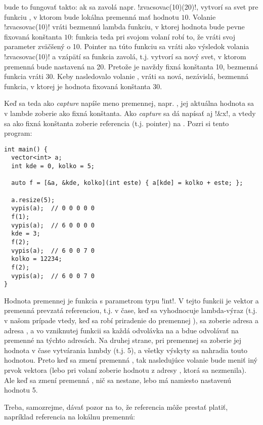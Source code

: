 {bude to fungovať takto: ak sa zavolá napr. \prg!zvacsovac(10)(20)!, vytvorí sa svet
pre funkciu , v ktorom bude lokálna premenná  mať hodnotu $10$.
Volanie \prg!zvacsovac(10)! vráti bezmennú lambda funkciu, v ktorej hodnota  bude pevne fixovaná
konštanta $10$: funkcia teda pri svojom volaní robí to, že vráti svoj parameter zväčšený o 10.
Pointer na túto funkciu sa vráti ako výsledok volania \prg!zvacsovac(10)! a vzápätí sa funkcia zavolá,
t.j. vytvorí sa nový svet, v ktorom premenná  bude nastavená na 20. Pretože 
 je navždy fixná konštanta 10, bezmenná funkcia vráti 30. Keby nasledovalo
volanie , vráti sa nová, nezávislá, bezmenná funkcia, v ktorej je hodnota 
 fixovaná konštanta 30.

 
Keď sa teda ako {\em capture} napíše meno premennej, napr. ,
jej aktuálna hodnota sa v lambde 
zoberie ako fixná konštanta. Ako {\em capture} sa dá napísať aj \prg!&x!,
a vtedy sa ako fixná konštanta zoberie referencia (t.j. pointer) na . 
Pozri si tento program:

\begin{lstlisting}
int main() {
  vector<int> a;
  int kde = 0, kolko = 5;

  auto f = [&a, &kde, kolko](int este) { a[kde] = kolko + este; };

  a.resize(5);
  vypis(a);  // 0 0 0 0 0
  f(1);
  vypis(a);  // 6 0 0 0 0
  kde = 3;
  f(2);
  vypis(a);  // 6 0 0 7 0
  kolko = 12234;
  f(2);
  vypis(a);  // 6 0 0 7 0
}
\end{lstlisting}

Hodnota premennej  je funkcia s parametrom typu \prg!int!. V tejto funkcii  je vektor 
a premenná  prevzatá referenciou, t.j. v čase, keď sa vyhodnocuje 
lambda-výraz (t.j. v našom prípade vtedy, keď sa robí priradenie do premennej ),
sa zoberie adresa  a adresa , a vo vzniknutej funkcii sa každá
odvolávka na  a  bdue odvolávať na premenné na týchto adresách. Na druhej 
strane, pri premennej  sa zoberie jej hodnota v čase vytvárania lambdy (t.j. 5),
a všetky výskyty  sa nahradia touto hodnotou. Preto keď sa zmení premenná 
, tak nasledujúce volanie  bude meniť iný prvok vektora (lebo pri volaní
zoberie hodnotu z adresy , ktorá sa nezmenila). Ale keď sa zmení premenná 
, nič sa nestane, lebo  má namiesto  nastavenú hodnotu 5.


Treba, samozrejme, dávať pozor na to, že referencia môže prestať platiť, napríklad
referencia na lokálnu premennú:

}
